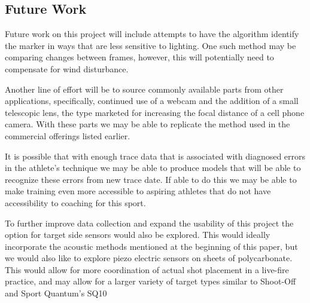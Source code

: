 \documentclass[conference]{IEEEtran}
\begin{document}
\subsection{Future Work}

Future work on this project will include attempts to have the algorithm identify the marker in ways that are less sensitive to lighting.
One such method may be comparing changes between frames,
however, this will potentially need to compensate for wind disturbance.

Another line of effort will be to source commonly available parts from other applications, specifically, continued use of a webcam and the addition of a small telescopic lens, the type marketed for increasing the focal distance of a cell phone camera.
With these parts we may be able to replicate the method used in the commercial offerings listed earlier.

It is possible that with enough trace data that is associated with diagnosed errors in the athlete's technique we may be able to produce models that will be able to recognize these errors from new trace date.
If able to do this we may be able to make training even more accessible to aspiring athletes that do not have accessibility to coaching for this sport.

To further improve data collection and expand the usability of this project the option for target side sensors would also be explored.
This would ideally incorporate the acoustic methods mentioned at the beginning of this paper, but we would also like to explore piezo electric sensors on sheets of polycarbonate.
This would allow for more coordination of actual shot placement in a live-fire practice, and may allow for a larger variety of target types similar to Shoot-Off \cite{shootoff} and Sport Quantum's SQ10 \cite{sportquantum}

\nocite{github}


\end{document}
